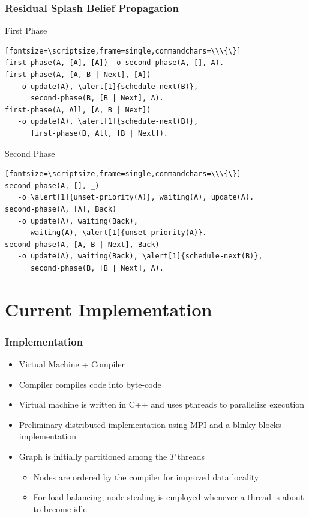 \documentclass{beamer}
\let\oldalert\alert
\renewcommand{\alert}[2][]{%
  \if\relax\detokenize{#1}\relax%
    \oldalert{#2}%
  \else
    \oldalert<#1>{#2}%
  \fi}
\begin{document}
\begin{frame}[fragile]
   \frametitle{Residual Splash Belief Propagation}
   \begin{block}{First Phase}
   \begin{verbatim}[fontsize=\scriptsize,frame=single,commandchars=\\\{\}]
first-phase(A, [A], [A]) -o second-phase(A, [], A).
first-phase(A, [A, B | Next], [A])
   -o update(A), \alert[1]{schedule-next(B)},
      second-phase(B, [B | Next], A).
first-phase(A, All, [A, B | Next])
   -o update(A), \alert[1]{schedule-next(B)},
      first-phase(B, All, [B | Next]).
   \end{verbatim}
\end{block}
   \begin{block}{Second Phase}
   \begin{verbatim}[fontsize=\scriptsize,frame=single,commandchars=\\\{\}]
second-phase(A, [], _)
   -o \alert[1]{unset-priority(A)}, waiting(A), update(A).
second-phase(A, [A], Back)
   -o update(A), waiting(Back),
      waiting(A), \alert[1]{unset-priority(A)}.
second-phase(A, [A, B | Next], Back)
   -o update(A), waiting(Back), \alert[1]{schedule-next(B)},
      second-phase(B, [B | Next], A).
   \end{verbatim}
\end{block}
\end{frame}

%

\section{Current Implementation}

\begin{frame}[fragile]
   \frametitle{Implementation}
   \begin{itemize}
      \item Virtual Machine + Compiler
      \item Compiler compiles code into byte-code
      \item Virtual machine is written in C++ and uses pthreads to parallelize execution
      \item Preliminary distributed implementation using MPI and a blinky blocks implementation
      \item Graph is initially partitioned among the $T$ threads
      \begin{itemize}
         \item Nodes are ordered by the compiler for improved data locality
         \item For load balancing, node stealing is employed whenever a thread is about to become idle
      \end{itemize}
   \end{itemize}
\end{frame}
\end{document}
